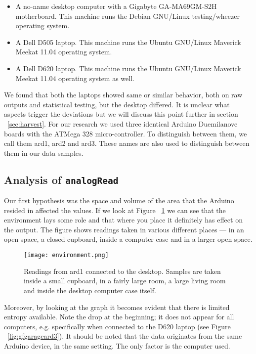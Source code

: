 \documentclass[a4paper]{article}           %
\begin{document}
\begin{itemize}
\item A no-name desktop computer with a Gigabyte GA-MA69GM-S2H motherboard. This machine runs the Debian GNU/Linux testing/wheezer operating system.
\item A Dell D505 laptop. This machine runs the Ubuntu GNU/Linux Maverick Meekat 11.04 operating system.
\item A Dell D620 laptop. This machine runs the Ubuntu GNU/Linux Maverick Meekat 11.04 operating system as well.
\end{itemize}

We found that both the laptops showed same or similar behavior, both on raw outputs and statistical testing, but the desktop differed. It is unclear what aspects trigger the deviations but we will discuss this point further in section ~\ref{sec:harvest}. For our research we used three identical Arduino Duemilanove boards with the ATMega 328 micro-controller. To distinguish between them, we call them ard1, ard2 and ard3. These names are also used to distinguish between them in our data samples. 

\subsection{Analysis of \texttt{analogRead}}


Our first hypothesis was the space and volume of the area that the Arduino resided in affected the values. If we look at Figure ~\ref{fig:ard3space} we can see that the environment lays some role and that where you place it definitely has effect on the output. The figure shows readings taken in various different places --- in an open space, a closed cupboard, inside a computer case and in a larger open space. 

\begin{figure}[H]
  \centering  
  \texttt{[image: environment.png]}
  
  \caption{Readings from ard1 connected to the desktop. Samples are taken inside a small cupboard, in a fairly large room, a large living room and inside the desktop computer case itself.}
  \label{fig:ard3space}
\end{figure}

Moreover, by looking at the graph it becomes evident that there is limited entropy available. Note the drop at the beginning; it does not appear for all computers, e.g. specifically when connected to the D620 laptop (see Figure ~\ref{fig:gfgarageard3}). It should be noted that the data originates from the same Arduino device, in the same setting. The only factor is the computer used. 
\end{document}
